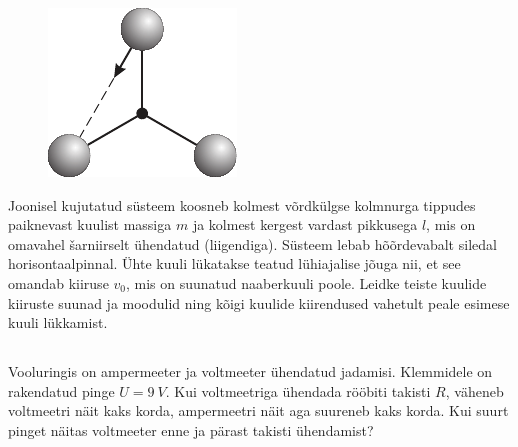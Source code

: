 \documentclass[10pt]{article}
\begin{document}
{
\begin{figure}
	\begin{center}
		\vspace{-25pt}
		\includegraphics[width=\linewidth]{2006-v3g-10-yl}
	\end{center}
\end{figure}
Joonisel kujutatud süsteem koosneb kolmest võrdkülgse kolmnurga tippudes paiknevast kuulist massiga $m$ ja kolmest kergest vardast pikkusega $l$, mis on omavahel šarniirselt ühendatud (liigendiga). Süsteem lebab hõõrdevabalt siledal horisontaalpinnal. Ühte kuuli lükatakse teatud lühiajalise jõuga nii, et see omandab kiiruse $v_0$, mis on suunatud naaberkuuli poole. Leidke teiste kuulide kiiruste suunad ja moodulid ning kõigi kuulide kiirendused vahetult peale esimese kuuli lükkamist.
\probend
\bigskip
\newpage\subsection{\protect{}}


Vooluringis on ampermeeter ja voltmeeter ühendatud jadamisi. Klemmidele on rakendatud pinge $U = \SI{9}{V}$. Kui voltmeetriga ühendada rööbiti takisti $R$, väheneb voltmeetri näit kaks korda, ampermeetri näit aga suureneb kaks korda. Kui suurt pinget näitas voltmeeter enne ja pärast takisti ühendamist?

}
\end{document}
